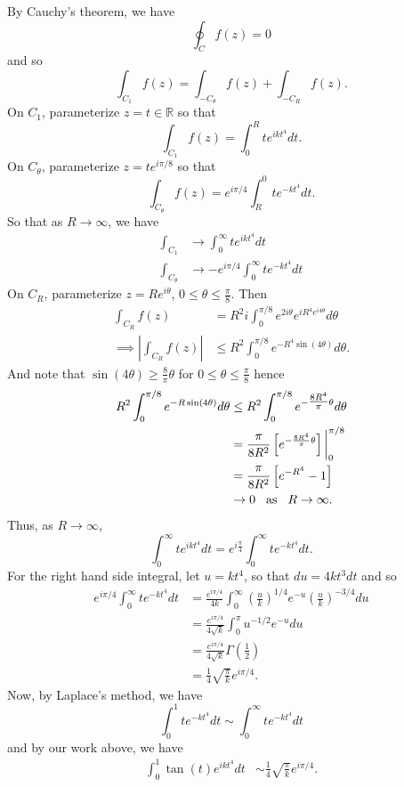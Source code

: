 \documentclass{article}
\begin{document}
\begin{itemize}
\begin{itemize}
        By Cauchy's theorem, we have
        \[\oint_C f(z) = 0\]
        and so
        \[\int_{C_1} f(z) = \int_{-C_{\theta}} f(z) + \int_{-C_R} f(z).\]
        On $C_1$, parameterize $z = t \in \mathbb{R}$ so that 
        \[\int_{C_1}f(z) = \int_0^R te^{ikt^4}dt.\]
        On $C_{\theta}$, parameterize $z = te^{i\pi/8}$ so that 
        \[\int_{C_{\theta}}f(z) = e^{i\pi/4}\int_R^0 te^{-kt^4} dt.\]
        So that as $R \to \infty$, we have
        \begin{align*}
            \int_{C_1} &\to \int_0^{\infty}te^{ikt^4}dt\\
            \int_{C_{\theta}} &\to -e^{i\pi/4}\int_0^{\infty} te^{-kt^4}dt
        \end{align*}
        On $C_R$, parameterize $z = Re^{i\theta}$, $0 \leq \theta \leq \frac{\pi}{8}$. Then 
        \begin{align*}
            \int_{C_R} f(z) &= R^2i\int_0^{\pi/8}e^{2i\theta}e^{iR^4e^{i4\theta}}d\theta\\
            \implies \left|\int_{C_R}f(z)\right| &\leq R^2\int_0^{\pi/8}e^{-R^4\sin(4\theta)}d\theta.
        \end{align*}
        And note that $\sin(4\theta) \geq \frac{8}{\pi}\theta$ for $0 \leq \theta \leq \frac{\pi}{8}$ hence
        \begin{align*}
            R^2\int_0^{\pi/8} e^{-R\sin(4\theta)}d\theta &\leq R^2\int_0^{\pi/8} e^{-\tfrac{8R^4}{\pi}\theta}d\theta\\
            &= \frac{\pi}{8R^2}\left[e^{-\frac{8R^4}{\pi}\theta}\right]\bigg|_0^{\pi/8}\\
            &= \frac{\pi}{8R^2}\left[e^{-R^4} - 1\right]\\
            &\to 0 \hspace{0.3cm} \text{as} \hspace{0.3cm} R \to \infty.
        \end{align*}
        Thus, as $R \to \infty$, 
        \[\int_0^{\infty}te^{ikt^4}dt = e^{i\frac{\pi}{4}}\int_0^{\infty} te^{-kt^4}dt.\]
        For the right hand side integral, let $u = kt^4$, so that $du = 4kt^3dt$ and so 
        \begin{align*}
            e^{i\pi/4}\int_0^{\infty}te^{-kt^4}dt &= \frac{e^{i\pi/4}}{4k}\int_0^{\infty} \left(\frac{u}{k}\right)^{1/4}e^{-u}\left(\frac{u}{k}\right)^{-3/4}du\\
            &= \frac{e^{i\pi/4}}{4\sqrt{k}}\int_0^{\pi}u^{-1/2}e^{-u}du\\
            &= \frac{e^{i\pi/4}}{4\sqrt{k}}\Gamma\left(\frac{1}{2}\right)\\
            &= \frac{1}{4}\sqrt{\frac{\pi}{k}}e^{i\pi/4}.
        \end{align*}
        Now, by Laplace's method, we have
        \[\int_0^{1}te^{-kt^4}dt \sim \int_0^{\infty} te^{-kt^4} dt\]
        and by our work above, we have
        \begin{align*}
            \int_0^1\tan(t)e^{ikt^4}dt &\sim \frac{1}{4}\sqrt{\frac{\pi}{k}}e^{i\pi/4}.
        \end{align*}
    \end{itemize}


\end{itemize}
\end{document}
